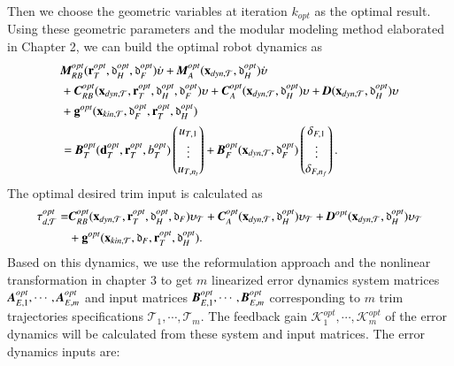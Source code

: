 Then we choose the geometric variables at iteration $k_{opt}$ as the optimal result. Using these geometric parameters and the modular modeling method elaborated in Chapter 2, we can build the optimal robot dynamics as
\begin{align}
&\emph{\textbf{M}}_{RB}^{opt}(\vec{r}_{T}^{opt},\mathfrak{d}_{H}^{opt},\mathfrak{d}_{F}^{opt})\dot{\vec{\upsilon}}+\emph{\textbf{M}}_{A}^{opt}(\vec{x}_{dyn,\mathcal{T}},\mathfrak{d}_{H}^{opt})\dot{\vec{\upsilon}} \nonumber \\
&+\emph{\textbf{C}}_{RB}^{opt}(\vec{x}_{dyn,\mathcal{T}},\vec{r}_{T}^{opt},\mathfrak{d}_{H}^{opt},\mathfrak{d}_{F}^{opt})\vec{\upsilon}+ 
\emph{\textbf{C}}_{A}^{opt}(\vec{x}_{dyn,\mathcal{T}},\mathfrak{d}_{H}^{opt})\vec{\upsilon}+\emph{\textbf{D}}(\vec{x}_{dyn,\mathcal{T}},\mathfrak{d}_{H}^{opt})\vec{\upsilon} \nonumber \\
&+\vec{g}^{opt}(\vec{x}_{kin,\mathcal{T}},\mathfrak{d}_{F}^{opt},\vec{r}_{T}^{opt},\mathfrak{d}_{H}^{opt}) \nonumber \\
&=\emph{\textbf{B}}_{T}^{opt}(\vec{d}_{T}^{opt},\vec{r}_{T}^{opt},b_{T}^{opt})
\begin{pmatrix}
u_{T,1}  \\ \vdots \\ u_{T,n_{t}}
\end{pmatrix}+
\emph{\textbf{B}}_{F}^{opt}(\vec{x}_{dyn,\mathcal{T}},\mathfrak{d}_{F}^{opt})
\begin{pmatrix}
\delta_{F,1}  \\ \vdots \\ \delta_{F,n_{f}}
\end{pmatrix}.
\end{align}
The optimal desired trim input is calculated as
\begin{align}
\vec{\tau}_{d,\mathcal{T}}^{opt}=&\emph{\textbf{C}}_{RB}^{opt}(\vec{x}_{dyn,\mathcal{T}},\vec{r}_{T}^{opt},\mathfrak{d}_{H}^{opt},\mathfrak{d}_{F})\vec{\upsilon}_{\mathcal{T}}+ 
\emph{\textbf{C}}_{A}^{opt}(\vec{x}_{dyn,\mathcal{T}},\mathfrak{d}_{H}^{opt})\vec{\upsilon}_{\mathcal{T}}+\emph{\textbf{D}}^{opt}(\vec{x}_{dyn,\mathcal{T}},\mathfrak{d}_{H}^{opt})\vec{\upsilon}_{\mathcal{T}} \nonumber \\
&+\vec{g}^{opt}(\vec{x}_{kin,\mathcal{T}},\mathfrak{d}_{F},\vec{r}_{T}^{opt},\mathfrak{d}_{H}^{opt}).
\end{align}
Based on this dynamics, we use the reformulation approach and the nonlinear transformation in chapter 3 to get $m$ linearized error dynamics system matrices $\emph{\textbf{A}}_{E,1}^{opt}, \cdots, \emph{\textbf{A}}_{E,m}^{opt}$ and input matrices $\emph{\textbf{B}}_{E,1}^{opt}, \cdots, \emph{\textbf{B}}_{E,m}^{opt}$ corresponding to $m$ trim trajectories specifications $\mathcal{T}_{1}, \cdots, \mathcal{T}_{m}$. The feedback gain $\mathcal{K}_{1}^{opt}, \cdots, \mathcal{K}_{m}^{opt}$ of the error dynamics will be calculated from these system and input matrices. The error dynamics inputs are:
